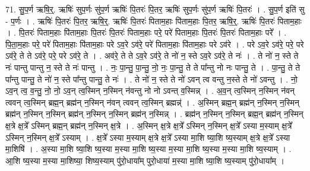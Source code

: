 \documentclass[17pt]{extarticle}
\begin{document}
71. सु॒प॒र्ण ऋषि॒र्॒. ऋषिः॑ सुप॒र्णः सु॑प॒र्ण ऋषिः॑ पि॒तरः॑ पि॒तर॒ ऋषिः॑ सुप॒र्णः सु॑प॒र्ण ऋषिः॑ पि॒तरः॑ । . सु॒प॒र्ण इति॑ सु - प॒र्णः । . ऋषिः॑ पि॒तरः॑ पि॒तर॒ ऋषि॒र्॒. ऋषिः॑ पि॒तरः॑ पिताम॒हाः पि॑ताम॒हाः पि॒तर॒ ऋषि॒र्॒. ऋषिः॑ पि॒तरः॑ पिताम॒हाः । . पि॒तरः॑ पिताम॒हाः पि॑ताम॒हाः पि॒तरः॑ पि॒तरः॑ पिताम॒हाः परे॒ परे॑ पिताम॒हाः पि॒तरः॑ पि॒तरः॑ पिताम॒हाः परे᳚ । . पि॒ता॒म॒हाः परे॒ परे॑ पिताम॒हाः पि॑ताम॒हाः परे ऽव॒रे ऽव॑रे॒ परे॑ पिताम॒हाः पि॑ताम॒हाः परे ऽव॑रे । . परे ऽव॒रे ऽव॑रे॒ परे॒ परे ऽव॑रे॒ ते ते ऽव॑रे॒ परे॒ परे ऽव॑रे॒ ते । . अव॑रे॒ ते ते ऽव॒रे ऽव॑रे॒ ते नो॑ न॒ स्ते ऽव॒रे ऽव॑रे॒ ते नः॑ । . ते नो॑ न॒ स्ते ते नः॑ पान्तु पान्तु न॒ स्ते ते नः॑ पान्तु । . नः॒ पा॒न्तु॒ पा॒न्तु॒ नो॒ नः॒ पा॒न्तु॒ ते ते पा᳚न्तु नो नः पान्तु॒ ते । . पा॒न्तु॒ ते ते पा᳚न्तु पान्तु॒ ते नो॑ न॒ स्ते पा᳚न्तु पान्तु॒ ते नः॑ । . ते नो॑ न॒ स्ते ते नो॑ ऽवन् त्व वन्तु न॒स्ते ते नो॑ ऽवन्तु । . नो॒ ऽव॒न् त्व॒ व॒न्तु॒ नो॒ नो॒ ऽव॒न् त्व॒स्मिन् न॒स्मिन् न॑वन्तु नो नो ऽवन्त् व॒स्मिन्न् । . अ॒व॒न् त्व॒स्मिन् न॒स्मिन् न॑वन् त्ववन् त्व॒स्मिन् ब्रह्म॒न् ब्रह्म॑न् न॒स्मिन् न॑वन् त्ववन् त्व॒स्मिन् ब्रह्मन्न्॑ । . अ॒स्मिन् ब्रह्म॒न् ब्रह्म॑न् न॒स्मिन् न॒स्मिन् ब्रह्म॑न् न॒स्मिन् न॒स्मिन् ब्रह्म॑न् न॒स्मिन् न॒स्मिन् ब्रह्म॑न् न॒स्मिन्न् । . ब्रह्म॑न् न॒स्मिन् न॒स्मिन् ब्रह्म॒न् ब्रह्म॑न् न॒स्मिन् क्ष॒त्रे क्ष॒त्रे᳚ ऽस्मिन् ब्रह्म॒न् ब्रह्म॑न् न॒स्मिन् क्ष॒त्रे । . अ॒स्मिन् क्ष॒त्रे क्ष॒त्रे᳚ ऽस्मिन् न॒स्मिन् क्ष॒त्रे᳚ ऽस्या म॒स्याम् क्ष॒त्रे᳚ ऽस्मिन् न॒स्मिन् क्ष॒त्रे᳚ ऽस्याम् । . क्ष॒त्रे᳚ ऽस्या म॒स्याम् क्ष॒त्रे क्ष॒त्रे᳚ ऽस्या मा॒शि ष्या॒शि ष्य॒स्याम् क्ष॒त्रे क्ष॒त्रे᳚ ऽस्या मा॒शिषि॑ । . अ॒स्या मा॒शि ष्या॒शि ष्य॒स्या म॒स्या मा॒शि ष्य॒स्या म॒स्या मा॒शि ष्य॒स्या म॒स्या मा॒शि ष्य॒स्याम् । . आ॒शि ष्य॒स्या म॒स्या मा॒शिष्या॒ शिष्य॒स्याम् पु॑रो॒धाया᳚म् पुरो॒धाया॑ म॒स्या मा॒शि ष्या॒शि ष्य॒स्याम् पु॑रो॒धाया᳚म् । \newline
\end{document}
